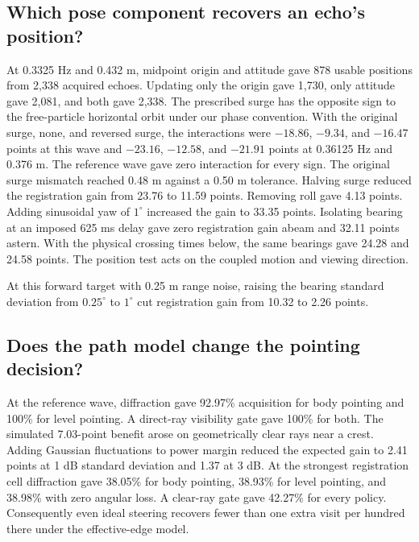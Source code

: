 \subsection{Which pose component recovers an echo's position?}
At 0.3325 Hz and 0.432 m, midpoint origin and attitude gave 878 usable positions from 2,338 acquired echoes. Updating only the origin gave 1,730, only attitude gave 2,081, and both gave 2,338. The prescribed surge has the opposite sign to the free-particle horizontal orbit under our phase convention. With the original surge, none, and reversed surge, the interactions were $-18.86$, $-9.34$, and $-16.47$ points at this wave and $-23.16$, $-12.58$, and $-21.91$ points at 0.36125 Hz and 0.376 m. The reference wave gave zero interaction for every sign. The original surge mismatch reached 0.48 m against a 0.50 m tolerance. Halving surge reduced the registration gain from 23.76 to 11.59 points. Removing roll gave 4.13 points. Adding sinusoidal yaw of $1^\circ$ increased the gain to 33.35 points. Isolating bearing at an imposed 625 ms delay gave zero registration gain abeam and 32.11 points astern. With the physical crossing times below, the same bearings gave 24.28 and 24.58 points. The position test acts on the coupled motion and viewing direction.

At this forward target with 0.25 m range noise, raising the bearing standard deviation from $0.25^\circ$ to $1^\circ$ cut registration gain from 10.32 to 2.26 points.



\subsection{Does the path model change the pointing decision?}
At the reference wave, diffraction gave 92.97\% acquisition for body pointing and 100\% for level pointing. A direct-ray visibility gate gave 100\% for both. The simulated 7.03-point benefit arose on geometrically clear rays near a crest. Adding Gaussian fluctuations to power margin reduced the expected gain to 2.41 points at 1 dB standard deviation and 1.37 at 3 dB. At the strongest registration cell diffraction gave 38.05\% for body pointing, 38.93\% for level pointing, and 38.98\% with zero angular loss. A clear-ray gate gave 42.27\% for every policy. Consequently even ideal steering recovers fewer than one extra visit per hundred there under the effective-edge model.




